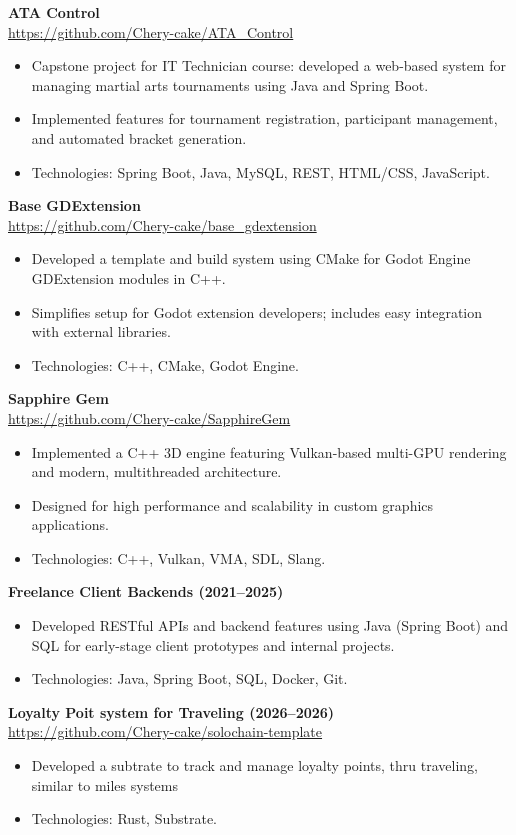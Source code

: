 
\textbf{ATA Control} \\
\url{https://github.com/Chery-cake/ATA_Control}
\begin{itemize}[leftmargin=*,noitemsep]
    \item Capstone project for IT Technician course: developed a web-based system for managing martial arts tournaments using Java and Spring Boot.
    \item Implemented features for tournament registration, participant management, and automated bracket generation.
    \item Technologies: Spring Boot, Java, MySQL, REST, HTML/CSS, JavaScript.
\end{itemize}

\textbf{Base GDExtension} \\
\url{https://github.com/Chery-cake/base_gdextension}
\begin{itemize}[leftmargin=*,noitemsep]
    \item Developed a template and build system using CMake for Godot Engine GDExtension modules in C++.
    \item Simplifies setup for Godot extension developers; includes easy integration with external libraries.
    \item Technologies: C++, CMake, Godot Engine.
\end{itemize}

\textbf{Sapphire Gem} \\
\url{https://github.com/Chery-cake/SapphireGem}
\begin{itemize}[leftmargin=*,noitemsep]
    \item Implemented a C++ 3D engine featuring Vulkan-based multi-GPU rendering and modern, multithreaded architecture.
    \item Designed for high performance and scalability in custom graphics applications.
    \item Technologies: C++, Vulkan, VMA, SDL, Slang.
\end{itemize}

\textbf{Freelance Client Backends (2021--2025)} \\
\vspace{-4pt}  
\begin{itemize}[leftmargin=*,noitemsep]
    \item Developed RESTful APIs and backend features using Java (Spring Boot) and SQL for early-stage client prototypes and internal projects.
    \item Technologies: Java, Spring Boot, SQL, Docker, Git.
\end{itemize}

\textbf{Loyalty Poit system for Traveling (2026--2026)} \\
\url{https://github.com/Chery-cake/solochain-template}
\begin{itemize}[leftmargin=*,noitemsep]
    \item Developed a subtrate to track and manage loyalty points, thru traveling, similar to miles systems
    \item Technologies: Rust, Substrate.
\end{itemize}
